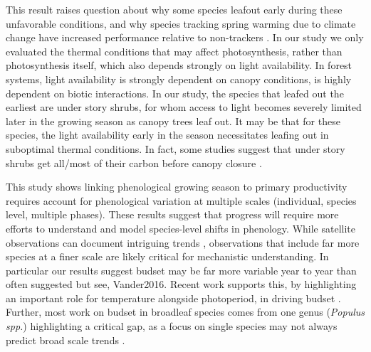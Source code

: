 \documentclass{article}[12pt]
\begin{document}
This result raises question about why some species leafout early during these unfavorable conditions, and why species tracking spring warming due to climate change have increased performance relative to non-trackers \citep{Cleland2012}. In our study we only evaluated the thermal conditions that may affect photosynthesis, rather than photosynthesis itself, which also depends strongly on light availability. In forest systems, light availability is strongly dependent on canopy conditions, is highly dependent on biotic interactions. In our study, the species that leafed out the earliest are under story shrubs, for whom access to light becomes severely limited later in the growing season as canopy trees leaf out. It may be that for these species, the light availability early in the season necessitates leafing out in suboptimal thermal conditions. In fact, some studies suggest that under story shrubs get all/most of their carbon before canopy closure \citep{AUGSPURGER2005}.

 This study shows linking phenological growing season to primary productivity requires account for phenological variation at multiple scales (individual, species level, multiple phases). These results suggest that progress will require more efforts to understand and model species-level shifts in phenology. While satellite observations can document intriguing trends \citep[e.g.,][]{Zohner2023}, observations that include far more species at a finer scale are likely critical for mechanistic understanding. In particular our results suggest budset may be far more variable year to year than often suggested \citep{Michelson2018} but see{, Vander2016}. Recent work supports this, by highlighting an important role for temperature alongside photoperiod, in driving budset \citep{Olsen2014,Rhode2011}. Further, most work on budset in broadleaf species comes from one genus (\emph{Populus spp.}) highlighting a critical gap, as a focus on single species may not always predict broad scale trends \citep{Morales-Castilla2024}. 
 
\end{document}
